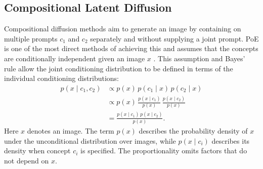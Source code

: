 \documentclass{article} %
\begin{document}
\subsection{Compositional Latent Diffusion}
Compositional diffusion methods aim to generate an image by containing on multiple prompts $c_1$ and $c_2$
separately and without supplying a joint prompt. PoE is one of the most direct methods of achieving this and assumes that the concepts are conditionally independent given an image $x$ \citep{liu2022compositional}. This assumption and
Bayes' rule allow the joint conditioning distribution to be defined in terms of the individual conditioning distributions:
\begin{equation}
\begin{aligned}
p(x\mid c_1,c_2)
&\propto p(x)\,p(c_1\mid x)\,p(c_2\mid x)\\
&\propto p(x)\,
  \frac{p(x\mid c_1)}{p(x)}\,
  \frac{p(x\mid c_2)}{p(x)}\\
&= \frac{p(x\mid c_1)\,p(x\mid c_2)}{p(x)}.
\end{aligned}
\label{eq:poe-density}
\end{equation}
Here $x$ denotes an image. The term $p(x)$ describes the probability
density of $x$ under the unconditional distribution over images,
while $p(x\mid c_i)$ describes its density when concept $c_i$ is
specified. The proportionality omits factors that do not depend on $x$.
\end{document}
